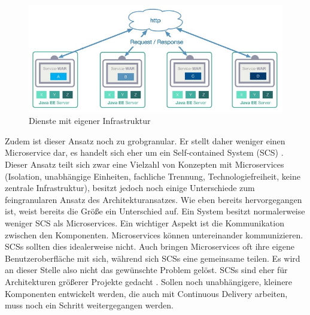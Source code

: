 \begin{figure}[h!]
	\centering
	\includegraphics[width=1.0\linewidth]{images/mp2}
	\caption{Dienste mit eigener Infrastruktur \cite{LarsRowekamp.2017d}}
	\label{fig:mp22}
\end{figure}
Zudem ist dieser Ansatz noch zu grobgranular. Er stellt daher weniger einen Microservice dar, es handelt sich eher um ein Self-contained System (SCS) \cite{jaxcenter.2016}. Dieser Ansatz teilt sich zwar eine Vielzahl von Konzepten mit Microservices (Isolation, unabhängige Einheiten, fachliche Trennung, Technologiefreiheit, keine zentrale Infrastruktur), besitzt jedoch noch einige Unterschiede zum feingranularen Ansatz des Architekturansatzes. Wie eben bereits hervorgegangen ist, weist bereits die Größe ein Unterschied auf. Ein System besitzt normalerweise weniger SCS als Microservices. Ein wichtiger Aspekt ist die Kommunikation zwischen den Komponenten. Microservices können untereinander kommunizieren. SCSs sollten dies idealerweise nicht. Auch bringen Microservices oft ihre eigene Benutzeroberfläche mit sich, während sich SCSs eine gemeinsame teilen. Es wird an dieser Stelle also nicht das gewünschte Problem gelöst. SCSs sind eher für Architekturen größerer Projekte gedacht \cite{selfcontainedservices.2017}. Sollen noch unabhängigere, kleinere Komponenten entwickelt werden, die auch mit Continuous Delivery arbeiten, muss noch ein Schritt weitergegangen werden.

 